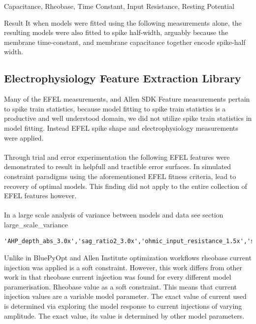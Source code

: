 Capacitance, Rheobase, Time Constant, Input Resistance, Resting Potential

Result It when models were fitted using the following measurements alone, the resulting models were also fitted to spike half-width, arguably because the membrane time-constant, and membrane capacitance together encode spike-half width.

\subsection{Electrophysiology Feature Extraction Library}

Many of the EFEL measurements, and Allen SDK Feature measurements pertain to spike train statistics, because model fitting to spike train statistics is a productive and well understood domain, we did not utilize spike train statistics in model fitting. Instead EFEL spike shape and electrophysiology measurements were applied.\\
\\
Through trial and error experimentation the following EFEL features were demonstrated to result in helpfull and tractible error surfaces. In simulated constraint paradigms using the aforementioned EFEL fitness criteria, lead to recovery of optimal models. This finding did not apply to the entire collection of EFEL features however.\\
\\
In a large scale analysis of variance between models and data see section large\_scale\_variance


\begin{verbatim}
'AHP_depth_abs_3.0x','sag_ratio2_3.0x','ohmic_input_resistance_1.5x','sag_ratio2_1.5x','peak_voltage_3.0x','peak_voltage_1.5x','voltage_base_3.0x','voltage_base_1.5x','Spikecount_1.5x','Spikecount_3.0x','ohmic_input_resistance_vb_ssse_1.5x'
\end{verbatim}


Unlike in BluePyOpt \cite{bluepyopt} and Allen Institute optimization workflows \cite{gouwens} rheobase current injection was applied is a soft constraint. However, this work differs from other work in that rheobase current injection was found for every different model paramerisation.
Rheobase value as a soft constraint. This means that current injection values are a variable model parameter. The exact value of current used is determined via exploring the model response to current injections of varying amplitude. The exact value, its value is determined by other model parameters.

